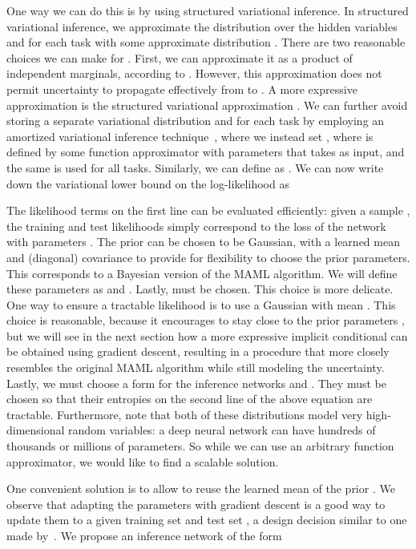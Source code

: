 \documentclass{article}
\begin{document}
One way we can do this is by using structured variational inference. In structured variational inference, we approximate the distribution over the hidden variables  and  for each task with some approximate distribution . There are two reasonable choices we can make for . First, we can approximate it as a product of independent marginals, according to . However, this approximation does not permit uncertainty to propagate effectively from  to . A more expressive approximation is the structured variational approximation . We can further avoid storing a separate variational distribution  and  for each task  by employing an amortized variational inference technique~\cite{kingma2013auto,johnson2016composing,shu2018amortized}, where we instead set , where  is defined by some function approximator with parameters  that takes  as input, and the same  is used for all tasks. Similarly, we can define  as . 
We can now write down the variational lower bound on the log-likelihood as

The likelihood terms on the first line can be evaluated efficiently: given a sample \mbox{}, the training and test likelihoods simply correspond to the loss of the network with parameters .
The prior  can be chosen to be Gaussian, with a learned mean and (diagonal) covariance to provide for flexibility to choose the prior parameters. This corresponds to a Bayesian version of the MAML algorithm.
We will define these parameters as  and . 
Lastly,  must be chosen. This choice is more delicate. One way to ensure a tractable likelihood is to use a Gaussian with mean . This choice is reasonable, because it encourages  to stay close to the prior parameters , 
but we will see in the next section how a more expressive implicit conditional can be obtained using gradient descent, resulting in a procedure that more closely resembles the original MAML algorithm while still modeling the uncertainty. Lastly, we must choose a form for the inference networks  and . They must be chosen so that their entropies on the second line of the above equation are tractable. Furthermore, note that both of these distributions model very high-dimensional random variables: a deep neural network can have hundreds of thousands or millions of parameters. So while we can use an arbitrary function approximator, we would like to find a scalable solution.

One convenient solution is to allow  to reuse the learned mean of the prior . We observe that adapting the parameters with gradient descent is a good way to update them to a given training set  and test set , a design decision similar to one made by~\citet{bayesianrnn}. We propose an inference network of the form
\end{document}
